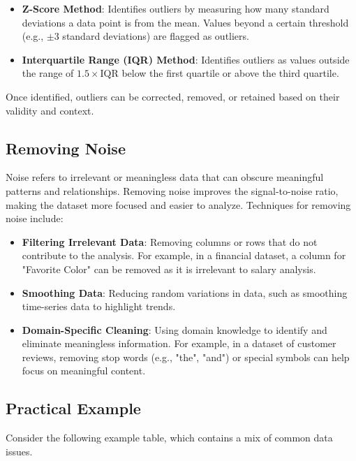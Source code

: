 \documentclass[12pt]{article}
\begin{document}
\begin{itemize}
    \item \textbf{Z-Score Method}: Identifies outliers by measuring how many standard deviations a data point is from the mean. Values beyond a certain threshold (e.g., $\pm3$ standard deviations) are flagged as outliers.
    \item \textbf{Interquartile Range (IQR) Method}: Identifies outliers as values outside the range of $1.5 \times \text{IQR}$ below the first quartile or above the third quartile.
\end{itemize}

Once identified, outliers can be corrected, removed, or retained based on their validity and context.

\subsection{Removing Noise}
Noise refers to irrelevant or meaningless data that can obscure meaningful patterns and relationships. Removing noise improves the signal-to-noise ratio, making the dataset more focused and easier to analyze. Techniques for removing noise include:

\begin{itemize}
    \item \textbf{Filtering Irrelevant Data}: Removing columns or rows that do not contribute to the analysis. For example, in a financial dataset, a column for "Favorite Color" can be removed as it is irrelevant to salary analysis.
    \item \textbf{Smoothing Data}: Reducing random variations in data, such as smoothing time-series data to highlight trends.
    \item \textbf{Domain-Specific Cleaning}: Using domain knowledge to identify and eliminate meaningless information. For example, in a dataset of customer reviews, removing stop words (e.g., "the", "and") or special symbols can help focus on meaningful content.
\end{itemize}

\subsection{Practical Example}

Consider the following example table, which contains a mix of common data issues.
\end{document}
